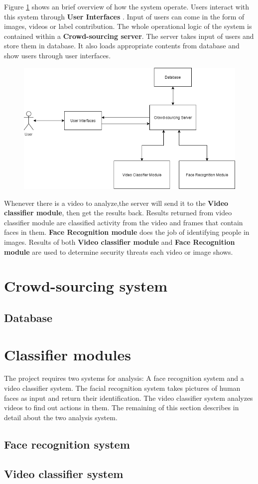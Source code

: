 Figure \ref{chap3:system_overview_basic} shows an brief overview of how the system operate. Users interact with this system through \textbf{User Interfaces}
. Input of users can come in the form of images, videos or label contribution. The whole operational logic of the  system is contained within a \textbf{Crowd-sourcing server}. The server takes input of users and store them in database. It also loads appropriate contents from database and show users through user interfaces. 
\begin{center}
    \begin{figure}[H]
    \centering
    \includegraphics[width=1\columnwidth]{images/chap3/system_overview_basic.png}
    \label{chap3:system_overview_basic}
    \end{figure}
\end{center}
Whenever there is a video to analyze,the server will send it to the \textbf{Video classifier module}, then get the results back. Results returned from video classifier module are classified activity from the video and frames that contain faces in them. \textbf{Face Recognition module} does the job of identifying people in images. Results of both \textbf{Video classifier module} and \textbf{Face Recognition module} are used to determine security threats each video or image shows.

\section{Crowd-sourcing system}
\subsection{Database}
\section{Classifier modules}
The project requires two systems for analysis: A face recognition system and a video classifier system. The facial recognition system takes pictures of human faces as input and return their identification. The video classifier system analyzes videos to find out actions in them. The remaining of this section describes in detail about the two analysis system.
\subsection{Face recognition system}

\subsection{Video classifier system}
